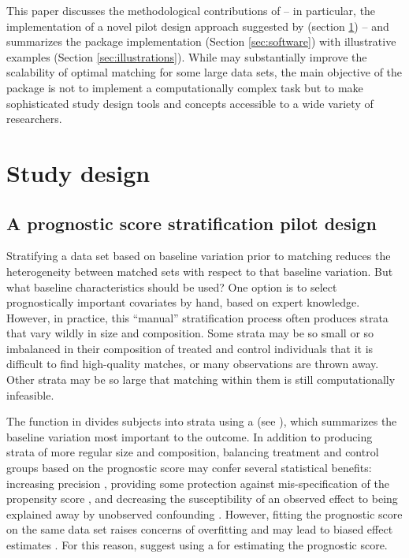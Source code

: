 This paper discusses the methodological contributions of  -- in particular, the implementation of a novel pilot design approach suggested by \citet{aikens2020pilot} (section \ref{sec:Study_design}) -- and summarizes the package implementation (Section \ref{sec:software}) with illustrative examples (Section \ref{sec:illustrations}).  While  may substantially improve the scalability of optimal matching for some large data sets, the main objective of the package is not to implement a computationally complex task but to make sophisticated study design tools and concepts accessible to a wide variety of researchers. 

\section{Study design}\label{sec:Study_design}

\subsection[Pilot designs]{A prognostic score stratification pilot design}\label{subsec:pilot_designs}

Stratifying a data set based on baseline variation prior to matching reduces the heterogeneity between matched sets with respect to that baseline variation. But what baseline characteristics should be used? One option is to select prognostically important covariates by hand, based on expert knowledge. However, in practice, this ``manual'' stratification process often produces strata that vary wildly in size and composition. Some strata may be so small or so imbalanced in their composition of treated and control individuals that it is difficult to find high-quality matches, or many observations are thrown away.  Other strata may be so large that matching within them is still computationally infeasible.

The  function in  divides subjects into strata using a  (see \citet{hansen2008prognostic}), which summarizes the baseline variation most important to the outcome.  In addition to producing strata of more regular size and composition, balancing treatment and control groups based on the prognostic score may confer several statistical benefits: increasing precision \citep{aikens2020pilot, leacy2014joint}, providing some protection against mis-specification of the propensity score \citep{leacy2014joint, antonelli2018doubly}, and decreasing the susceptibility of an observed effect to being explained away by unobserved confounding \citep{rosenbaum1983central, aikens2020pilot}.  However, fitting the prognostic score on the same data set raises concerns of overfitting and may lead to biased effect estimates \citep{hansen2008prognostic, abadie2018endogenous}.  For this reason, \citep{aikens2020pilot} suggest using a  for estimating the prognostic score.

